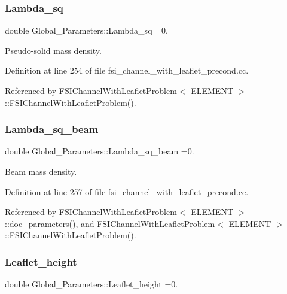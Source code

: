 \subsubsection{\texorpdfstring{Lambda\+\_\+sq}{Lambda\_sq}}
{\footnotesize\ttfamily double Global\+\_\+\+Parameters\+::\+Lambda\+\_\+sq =0.}



Pseudo-\/solid mass density. 



Definition at line 254 of file fsi\+\_\+channel\+\_\+with\+\_\+leaflet\+\_\+precond.\+cc.



Referenced by F\+S\+I\+Channel\+With\+Leaflet\+Problem$<$ E\+L\+E\+M\+E\+N\+T $>$\+::\+F\+S\+I\+Channel\+With\+Leaflet\+Problem().

\mbox{\label{namespaceGlobal__Parameters_af35d88426851c22dd07a69aa66de959a}} 
\subsubsection{\texorpdfstring{Lambda\+\_\+sq\+\_\+beam}{Lambda\_sq\_beam}}
{\footnotesize\ttfamily double Global\+\_\+\+Parameters\+::\+Lambda\+\_\+sq\+\_\+beam =0.}



Beam mass density. 



Definition at line 257 of file fsi\+\_\+channel\+\_\+with\+\_\+leaflet\+\_\+precond.\+cc.



Referenced by F\+S\+I\+Channel\+With\+Leaflet\+Problem$<$ E\+L\+E\+M\+E\+N\+T $>$\+::doc\+\_\+parameters(), and F\+S\+I\+Channel\+With\+Leaflet\+Problem$<$ E\+L\+E\+M\+E\+N\+T $>$\+::\+F\+S\+I\+Channel\+With\+Leaflet\+Problem().

\mbox{\label{namespaceGlobal__Parameters_a58c392f43a98de12e513c4bc50169fa6}} 
\subsubsection{\texorpdfstring{Leaflet\+\_\+height}{Leaflet\_height}}
{\footnotesize\ttfamily double Global\+\_\+\+Parameters\+::\+Leaflet\+\_\+height =0.}



